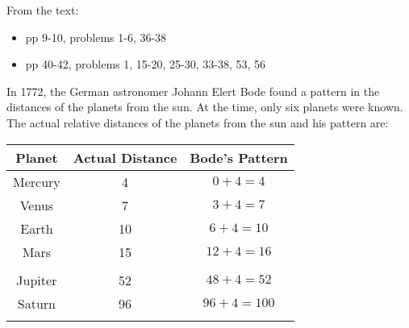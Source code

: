\documentclass[fleqn,addpoints]{exam}
\begin{document}
  \begin{questions}

    \question

    From the text:
    \begin{itemize}

      \item pp 9-10, problems 1-6, 36-38

      \item pp 40-42, problems 1, 15-20, 25-30, 33-38, 53, 56

    \end{itemize}

    \question

    In 1772, the German astronomer Johann Elert Bode found a pattern in the distances of the planets
    from the sun.  At the time, only six planets were known.  The actual relative distances of the
    planets from the sun and his pattern are:

    \vspace{0.5 cm}
      \begin{tabular}{|c|c|c|}
        \hline
        Planet  & Actual Distance & Bode's Pattern \\ 
        \hline
        Mercury & 4               & \( 0 + 4 = 4 \) \\
        Venus   & 7               & \( 3 + 4 = 7 \) \\
        Earth   & 10              & \( 6 + 4 = 10 \) \\
        Mars    & 15              & \( 12 + 4 = 16 \) \\
                &                 &  \\
        Jupiter & 52              & \( 48 + 4 = 52 \) \\
        Saturn  & 96              & \( 96 + 4 = 100 \) \\
                &                 &  \\
        \hline
      \end{tabular}
    \vspace{0.5 cm}

\end{questions}
\end{document}
